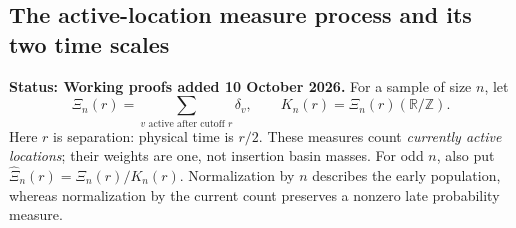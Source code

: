 \documentclass[11pt,letterpaper]{article}
\newcommand{\T}{\mathbb R/\mathbb Z}\newcommand{\Leb}{\operatorname{Leb}}
\newcommand{\status}[1]{\textbf{Status: #1.}}
\begin{document}
\subsection{The active-location measure process and its two time scales}
\label{sec:measure-process}

\status{Working proofs added 10 October 2026}
For a sample of size $n$, let
\[
 \Xi_n(r)=\sum_{v\text{ active after cutoff }r}\delta_v,
 \qquad K_n(r)=\Xi_n(r)(\T).
\]
Here $r$ is separation: physical time is $r/2$. These measures count
\emph{currently active locations}; their weights are one, not insertion
basin masses. For odd $n$, also put $\widehat\Xi_n(r)=\Xi_n(r)/K_n(r)$.
Normalization by $n$ describes the early population, whereas normalization
by the current count preserves a nonzero late probability measure.
\end{document}
